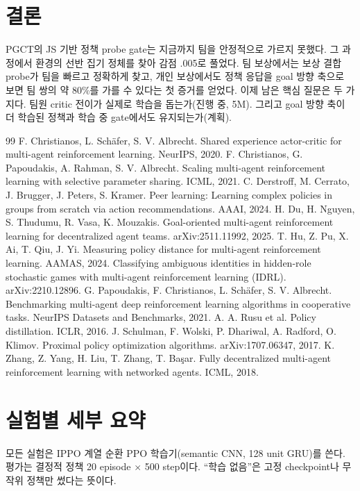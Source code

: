 \documentclass[10pt]{article}
\begin{document}
\section{결론}
PGCT의 JS 기반 정책 probe gate는 지금까지 팀을 안정적으로 가르지 못했다. 그 과정에서 환경의 선반 집기 정체를 찾아 감점 .005로 풀었다.
팀 보상에서는 보상 결합 probe가 팀을 빠르고 정확하게 찾고, 개인 보상에서도 정책 응답을 goal 방향 축으로 보면 팀 쌍의 약 80\%를 가를 수 있다는 첫 증거를 얻었다.
이제 남은 핵심 질문은 두 가지다. 팀원 critic 전이가 실제로 학습을 돕는가(진행 중, 5M). 그리고 goal 방향 축이 더 학습된 정책과 학습 중 gate에서도 유지되는가(계획).

\begin{thebibliography}{99}
 F. Christianos, L. Sch\"afer, S. V. Albrecht. Shared experience actor-critic for multi-agent reinforcement learning. NeurIPS, 2020.
 F. Christianos, G. Papoudakis, A. Rahman, S. V. Albrecht. Scaling multi-agent reinforcement learning with selective parameter sharing. ICML, 2021.
 C. Derstroff, M. Cerrato, J. Brugger, J. Peters, S. Kramer. Peer learning: Learning complex policies in groups from scratch via action recommendations. AAAI, 2024.
 H. Du, H. Nguyen, S. Thudumu, R. Vasa, K. Mouzakis. Goal-oriented multi-agent reinforcement learning for decentralized agent teams. arXiv:2511.11992, 2025.
 T. Hu, Z. Pu, X. Ai, T. Qiu, J. Yi. Measuring policy distance for multi-agent reinforcement learning. AAMAS, 2024.
 Classifying ambiguous identities in hidden-role stochastic games with multi-agent reinforcement learning (IDRL). arXiv:2210.12896.
 G. Papoudakis, F. Christianos, L. Sch\"afer, S. V. Albrecht. Benchmarking multi-agent deep reinforcement learning algorithms in cooperative tasks. NeurIPS Datasets and Benchmarks, 2021.
 A. A. Rusu et al. Policy distillation. ICLR, 2016.
 J. Schulman, F. Wolski, P. Dhariwal, A. Radford, O. Klimov. Proximal policy optimization algorithms. arXiv:1707.06347, 2017.
 K. Zhang, Z. Yang, H. Liu, T. Zhang, T. Ba\c{s}ar. Fully decentralized multi-agent reinforcement learning with networked agents. ICML, 2018.
\end{thebibliography}

\appendix
\section{실험별 세부 요약}
모든 실험은 IPPO 계열 순환 PPO 학습기(semantic CNN, 128 unit GRU)를 쓴다. 평가는 결정적 정책 20 episode $\times$ 500 step이다. ``학습 없음''은 고정 checkpoint나 무작위 정책만 썼다는 뜻이다.
\end{document}
